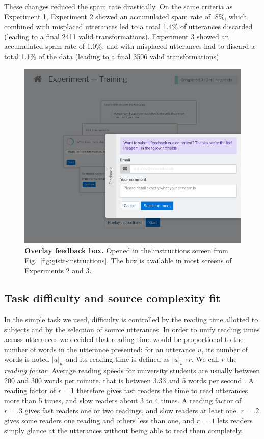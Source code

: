 These changes reduced the spam rate drastically. On the same criteria as
Experiment 1, Experiment 2 showed an accumulated spam rate of .8\%,
which combined with misplaced utterances led to a total 1.4\% of
utterances discarded (leading to a final 2411 valid transformations).
Experiment 3 showed an accumulated spam rate of 1.0\%, and with
misplaced utterances had to discard a total 1.1\% of the data (leading
to a final 3506 valid transformations).

\begin{figure}[!ht]
  \centering
  \includegraphics[width=.75\linewidth]{images/manual/gistr-feedback.png}
  \caption[Overlay feedback box]{
  \textbf{Overlay feedback box.}
  Opened in the instructions screen from Fig.~\ref{fig:gistr-instructions}.
  The box is available in most screens of Experiments 2 and 3.
  }
  \label{fig:gistr-feedback}
\end{figure}

\subsection{Task difficulty and source complexity
fit}\label{task-difficulty-and-source-complexity-fit}

In the simple task we used, difficulty is controlled by the reading time
allotted to subjects and by the selection of source utterances. In order
to unify reading times across utterances we decided that reading time
would be proportional to the number of words in the utterance presented:
for an utterance \(u\), its number of words is noted \(|u|_w\) and its
reading time is defined as \(|u|_w \cdot r\). We call \(r\) the
\emph{reading factor}. Average reading speeds for university students
are usually between 200 and 300 words per minute, that is between 3.33
and 5 words per second \autocite[see][where fast readers average at
330~wpm and slow readers average at 207~wpm]{rayner_eye_2010}. A reading
factor of \(r = 1\) therefore gives fast readers the time to read
utterances more than 5 times, and slow readers about 3 to 4 times. A
reading factor of \(r = .3\) gives fast readers one or two readings, and
slow readers at least one. \(r = .2\) gives some readers one reading and
others less than one, and \(r = .1\) lets readers simply glance at the
utterances without being able to read them completely.

